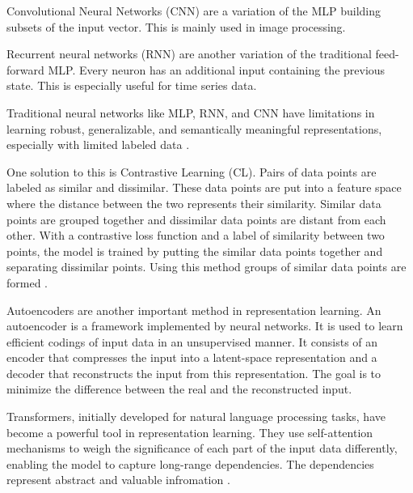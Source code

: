 Convolutional Neural Networks (CNN) are a variation of the MLP building subsets of the input vector. This is mainly used in image processing.

Recurrent neural networks (RNN) are another variation of the traditional feed-forward MLP. Every neuron has an additional input containing the previous state. This is especially useful for time series data.

Traditional neural networks like MLP, RNN, and CNN have limitations in learning robust, generalizable, and semantically meaningful representations, especially with limited labeled data \cite{shi_trade-off_2023}.

One solution to this is Contrastive Learning (CL). Pairs of data points are labeled as similar and dissimilar. These data points are put into a feature space where the distance between the two represents their similarity. Similar data points are grouped together and dissimilar data points are distant from each other. With a contrastive loss function and a label of similarity between two points, the model is trained by putting the similar data points together and separating dissimilar points. Using this method groups of similar data points are formed \cite{shi_trade-off_2023}.

Autoencoders are another important method in representation learning. An autoencoder is a framework implemented by neural networks. It is used to learn efficient codings of input data in an unsupervised manner. It consists of an encoder that compresses the input into a latent-space representation and a decoder that reconstructs the input from this representation. The goal is to minimize the difference between the real and the reconstructed input.

Transformers, initially developed for natural language processing tasks, have become a powerful tool in representation learning. They use self-attention mechanisms to weigh the significance of each part of the input data differently, enabling the model to capture long-range dependencies. The dependencies represent abstract and valuable infromation \cite{vaswani_attention_2017}.

